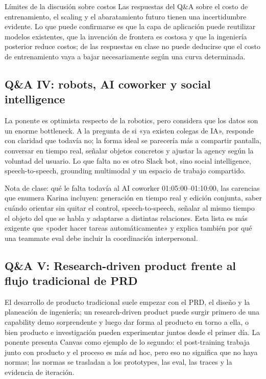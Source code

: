 \begin{warningbox}{Límites de la discusión sobre costos}
Las respuestas del Q\&A sobre el costo de entrenamiento, el scaling y el abaratamiento futuro tienen una incertidumbre evidente. Lo que puede confirmarse es que la capa de aplicación puede reutilizar modelos existentes, que la invención de frontera es costosa y que la ingeniería posterior reduce costos; de las respuestas en clase no puede deducirse que el costo de entrenamiento vaya a bajar necesariamente según una curva determinada.
\end{warningbox}

\subsection{Q\&A IV: robots, AI coworker y social intelligence}

La ponente es optimista respecto de la robotics, pero considera que los datos son un enorme bottleneck. A la pregunta de si «ya existen colegas de IA», responde con claridad que todavía no; la forma ideal se parecería más a compartir pantalla, conversar en tiempo real, señalar objetos concretos y ajustar la agency según la voluntad del usuario. Lo que falta no es otro Slack bot, sino social intelligence, speech-to-speech, grounding multimodal y un espacio de trabajo compartido.

\begin{knowledgebox}{Nota de clase: qué le falta todavía al AI coworker}
01:05:00--01:10:00, las carencias que enumera Karina incluyen: generación en tiempo real y edición conjunta, saber cuándo orientar sin quitar el control, speech-to-speech, señalar al mismo tiempo el objeto del que se habla y adaptarse a distintas relaciones. Esta lista es más exigente que «poder hacer tareas automáticamente» y explica también por qué una teammate eval debe incluir la coordinación interpersonal.
\end{knowledgebox}

\subsection{Q\&A V: Research-driven product frente al flujo tradicional de PRD}

El desarrollo de producto tradicional suele empezar con el PRD, el diseño y la planeación de ingeniería; un research-driven product puede surgir primero de una capability demo sorprendente y luego dar forma al producto en torno a ella, o bien producto e investigación pueden experimentar juntos desde el primer día. La ponente presenta Canvas como ejemplo de lo segundo: el post-training trabaja junto con producto y el proceso es más ad hoc, pero eso no significa que no haya normas; las normas se trasladan a los prototypes, las eval, las traces y la evidencia de iteración.

